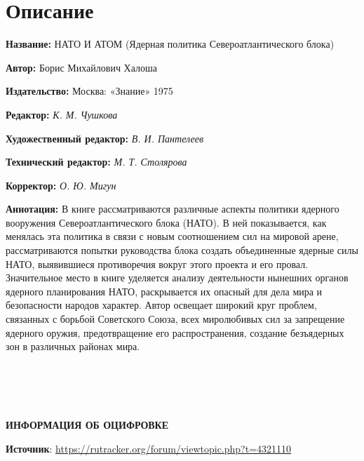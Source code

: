 \documentclass[12pt, a4paper, openany]{book}
\begin{document}
	
	
	\newpage
	
	\setcounter{secnumdepth}{0}
	
	
		\section*{Описание}
	
	{\bf Название:} НАТО И АТОМ (Ядерная политика Североатлантического блока) 
	
{\bf Автор:} Борис Михайлович Халоша
	
{\bf Издательство:} Москва: «Знание» 1975
	
		{\bf Редактор:} \textit{К. М. Чушкова}
	
		{\bf Художественный редактор:} \textit{В. И. Пантелеев}
	
		{\bf Технический редактор:} \textit{М. Т. Столярова}
	
		{\bf Корректор:} \textit{О. Ю. Мигун}
	
		{\bf Аннотация:} В книге рассматриваются различные аспекты политики ядерного вооружения Североатлантического блока (НАТО). В ней показывается, как менялась эта политика в связи с новым соотношением сил на мировой арене, рассматриваются попытки руководства блока создать объединенные ядерные силы НАТО, выявившиеся противоречия вокруг этого проекта и его провал. Значительное место в книге уделяется анализу деятельности нынешних органов ядерного планирования НАТО, раскрывается их опасный для дела мира и безопасности народов характер. Автор освещает широкий круг проблем, связанных с борьбой Советского Союза, всех миролюбивых сил за запрещение ядерного оружия, предотвращение его распространения, создание безъядерных зон в различных районах мира. 
		\thispagestyle{empty} %


	\newpage

\setcounter{secnumdepth}{0}  


\ \\
\ \\
\ \\
\ \\

\hangindent=2cm   	\textbf{ИНФОРМАЦИЯ ОБ ОЦИФРОВКЕ}

\hangindent=2cm   	\textbf{Источник}:  \href{https://rutracker.org/forum/viewtopic.php?t=4321110}{https://rutracker.org/forum/viewtopic.php?t=4321110} 
\end{document}
